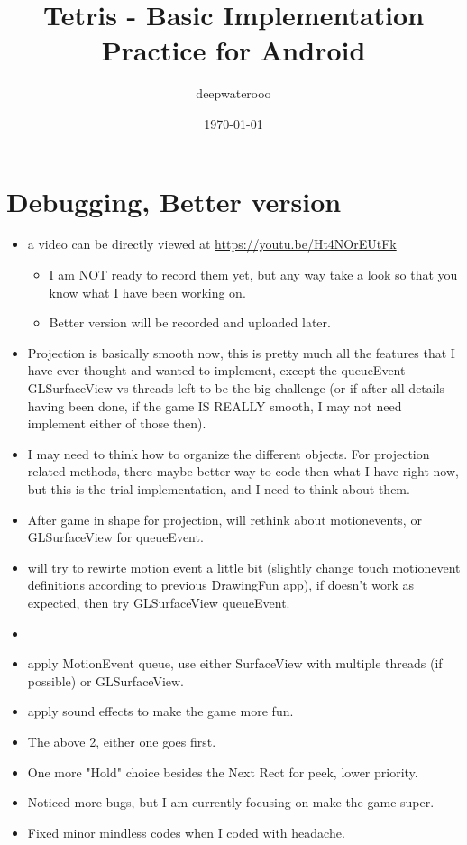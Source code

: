 \documentclass[9pt,b5paper]{article}
\author{deepwaterooo}
\date{\today}
\title{Tetris - Basic Implementation Practice for Android}
\begin{document}
\maketitle
\tableofcontents


\section{Debugging, Better version}
\label{sec-1}
\begin{itemize}
\item a video can be directly viewed at \url{https://youtu.be/Ht4NOrEUtFk}
\begin{itemize}
\item I am NOT ready to record them yet, but any way take a look so that you know what I have been working on.
\item Better version will be recorded and uploaded later.
\end{itemize}
\item Projection is basically smooth now, this is pretty much all the features that I have ever thought and wanted to implement, except the queueEvent GLSurfaceView vs threads left to be the big challenge (or if after all details having been done, if the game IS REALLY smooth, I may not need implement either of those then).
\item I may need to think how to organize the different objects. For projection related methods, there maybe better way to code then what I have right now, but this is the trial implementation, and I need to think about them.
\item After game in shape for projection, will rethink about motionevents, or GLSurfaceView for queueEvent.
\item will try to rewirte motion event a little bit (slightly change touch motionevent definitions according to previous DrawingFun app), if doesn't work as expected, then try GLSurfaceView queueEvent.
\item 
\item apply MotionEvent queue, use either SurfaceView with multiple threads (if possible) or GLSurfaceView.
\item apply sound effects to make the game more fun.
\item The above 2, either one goes first.
\item One more "Hold" choice besides the Next Rect for peek, lower priority.
\item Noticed more bugs, but I am currently focusing on make the game super.
\item Fixed minor mindless codes when I coded with headache.

\end{itemize}
\end{document}
